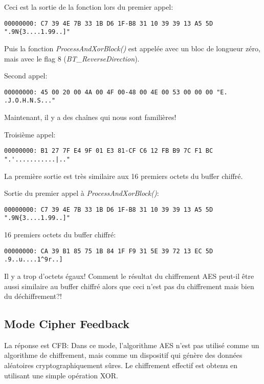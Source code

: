 Ceci est la sortie de la fonction lors du premier appel:

\begin{lstlisting}
00000000: C7 39 4E 7B 33 1B D6 1F-B8 31 10 39 39 13 A5 5D ".9N{3....1.99..]"
\end{lstlisting}

Puis la fonction \emph{ProcessAndXorBlock()} est appelée avec un bloc de longueur zéro,\\
mais avec le flag 8 (\emph{BT\_ReverseDirection}).

Second appel:

\begin{lstlisting}
00000000: 45 00 20 00 4A 00 4F 00-48 00 4E 00 53 00 00 00 "E. .J.O.H.N.S..."
\end{lstlisting}

Maintenant, il y a des chaînes qui nous sont familières!

Troisième appel:

\begin{lstlisting}
00000000: B1 27 7F E4 9F 01 E3 81-CF C6 12 FB B9 7C F1 BC ".'...........|.."
\end{lstlisting}

La première sortie est très similaire aux 16 premiers octets du buffer chiffré.

Sortie du premier appel à \emph{ProcessAndXorBlock()}:

\begin{lstlisting}
00000000: C7 39 4E 7B 33 1B D6 1F-B8 31 10 39 39 13 A5 5D ".9N{3....1.99..]"
\end{lstlisting}

16 premiers octets du buffer chiffré:

\begin{lstlisting}
00000000: CA 39 B1 85 75 1B 84 1F F9 31 5E 39 72 13 EC 5D  .9..u....1^9r..]
\end{lstlisting}

Il y a trop d'octets égaux!
Comment le résultat du chiffrement AES peut-il être aussi similaire au buffer chiffré
alors que ceci n'est pas du chiffrement mais bien du déchiffrement?!

\subsection{Mode Cipher Feedback}

La réponse est \ac{CFB}:
Dans ce mode, l'algorithme AES n'est pas utilisé comme un algorithme de chiffrement,
mais comme un dispositif qui génère des données aléatoires cryptographiquement sûres.
Le chiffrement effectif est obtenu en utilisant une simple opération XOR.

